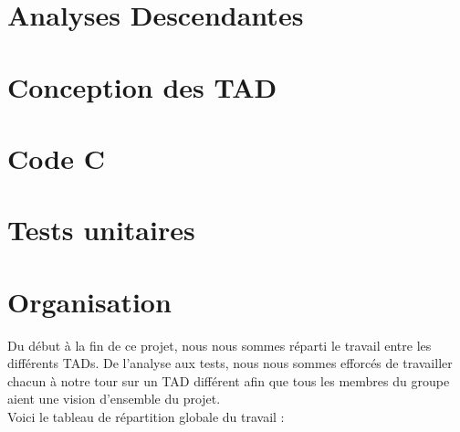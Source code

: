 \documentclass{article}
\begin{document}
\clearpage
\section{Analyses Descendantes}

\clearpage
\section{Conception des TAD}
	
	
	\clearpage

	
	\clearpage

	
	\clearpage

	

\clearpage
\section{Code C}

		
	
	
	
	
	
	
	
	

\clearpage
\section{Tests unitaires}
	
	
	
	
	

\clearpage
\section{Organisation}
Du début à la fin de ce projet, nous nous sommes réparti le travail entre les différents TADs. De l'analyse aux tests, nous nous sommes efforcés de travailler chacun à notre tour sur un TAD différent afin que tous les membres du groupe aient une vision d'ensemble du projet.\\
\newline
Voici le tableau de répartition globale du travail :
\end{document}
